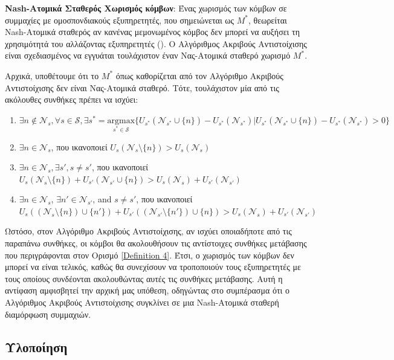 \label{Theorem 1} \textbf{Nash-Ατομικά Σταθερός Χωρισμός κόμβων}: Ένας χωρισμός των κόμβων σε συμμαχίες με ομοσπονδιακούς εξυπηρετητές, που σημειώνεται ως $M^*$, θεωρείται Nash-Ατομικά σταθερός αν κανένας μεμονωμένος κόμβος δεν μπορεί να αυξήσει τη χρησιμότητά του αλλάζοντας εξυπηρετητές (). Ο Αλγόριθμος Ακριβούς Αντιστοίχισης είναι σχεδιασμένος να εγγυάται τουλάχιστον έναν Νας-Ατομικά σταθερό χωρισμό $M^*$.

Αρχικά, υποθέτουμε ότι το $M^*$ όπως καθορίζεται από τον Αλγόριθμο Ακριβούς Αντιστοίχισης δεν είναι Νας-Ατομικά σταθερό. Τότε, τουλάχιστον μία από τις ακόλουθες συνθήκες πρέπει να ισχύει: 

\begin{enumerate}
    \item $\exists n \notin \mathcal{N}_s, \forall s \in \mathcal{S},  \exists s^* = \underset{s^* \in \mathcal{S}}{\text{argmax}} \{U_{s^*}( \mathcal{N}_{s^*} \cup \{n\}) - U_{s^*}(\mathcal{N}_{s^*}) | U_{s^*}(\mathcal{N}_{s^*}\cup \{n\}) - U_{s^*}( \mathcal{N}_{s^*}) > 0\}$
    \item $\exists n \in \mathcal{N}_s$, που ικανοποιεί $U_{s}(\mathcal{N}_{s}\setminus\{n\})> U_{s}(\mathcal{N}_{s})$
    \item $\exists n \in \mathcal{N}_{s}, \exists s', s \neq s'$, που ικανοποιεί $U_{s}(\mathcal{N}_{s} \setminus \{n\}) + U_{s'}(\mathcal{N}_{s'}\cup\{n\})>U_{s}(\mathcal{N}_{s}) +U_{s'}(\mathcal{N}_{s'})$
    \item $\exists n \in \mathcal{N}_{s}$, $\exists n' \in \mathcal{N}_{s'}$, and $s \neq s'$, που ικανοποιεί $U_{s}((\mathcal{N}_{s} \setminus \{n\})\cup\{n'\}) + U_{s'}((\mathcal{N}_{s'}\setminus\{n'\})\cup\{n\})>U_{s}(\mathcal{N}_{s}) +U_{s'}(\mathcal{N}_{s'})$
\end{enumerate}

Ωστόσο, στον Αλγόριθμο Ακριβούς Αντιστοίχισης, αν ισχύει οποιαδήποτε από τις παραπάνω συνθήκες, οι κόμβοι θα ακολουθήσουν τις αντίστοιχες συνθήκες μετάβασης που περιγράφονται στον Ορισμό \ref{Definition 4}. Έτσι, ο χωρισμός των κόμβων δεν μπορεί να είναι τελικός, καθώς θα συνεχίσουν να τροποποιούν τους εξυπηρετητές με τους οποίους συνδέονται ακολουθώντας αυτές τις συνθήκες μετάβασης. Αυτή η αντίφαση αμφισβητεί την αρχική μας υπόθεση, οδηγώντας στο συμπέρασμα ότι ο Αλγόριθμος Ακριβούς Αντιστοίχισης συγκλίνει σε μια Nash-Ατομικά σταθερή διαμόρφωση συμμαχιών.

\subsection{Υλοποίηση}

